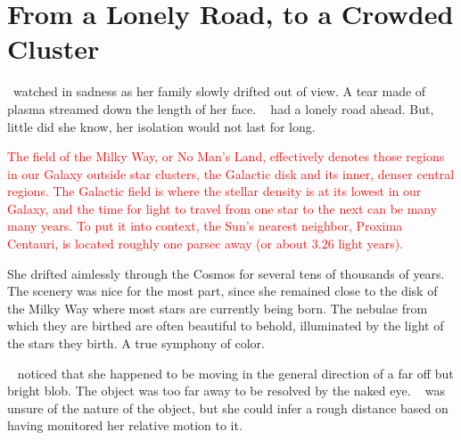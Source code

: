 \documentclass[main.tex]{subfiles}
\begin{document}
\chapter{From a Lonely Road, to a Crowded Cluster}

\par \nar \rmsterope~watched in sadness as her family slowly drifted out of view.  A tear made of plasma streamed down the length of her face.  \rmsterope~ had a lonely road ahead.  But, little did she know, her isolation would not last for long.

\begin{tcolorbox}[sharp corners, colback=red!30, colframe=red!80!blue, title=The Galactic Field]
\par \textcolor{red} {The field of the Milky Way, or No Man's Land, effectively denotes those regions in our Galaxy outside star clusters, the Galactic disk and its inner, denser central regions.  The Galactic field is where the stellar density is at its lowest in our Galaxy, and the time for light to travel from one star to the next can be many many years. To put it into context, the Sun's nearest neighbor, Proxima Centauri, is located roughly one parsec away (or about 3.26 light years).}
\end{tcolorbox}

\par \nar She drifted aimlessly through the Cosmos for several tens of thousands of years.  The scenery was nice for the most part, since she remained close to the disk of the Milky Way where most stars are currently being born.  The nebulae from which they are birthed are often beautiful to behold, illuminated by the light of the stars they birth.  A true symphony of color.  



\par \nar \rmsterope~  noticed that she happened to be moving in the general direction of a far off but bright blob.  The object was too far away to be resolved by the naked eye.  \rmsterope~ was unsure of the nature of the object, but she could infer a rough distance based on having monitored her relative motion to it.
\end{document}
